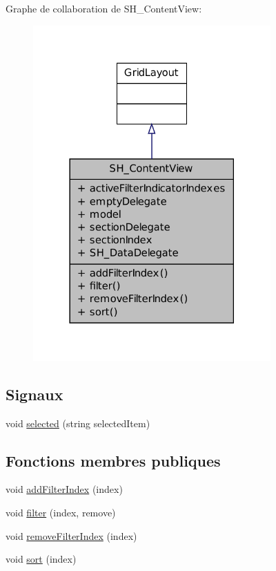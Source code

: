 Graphe de collaboration de S\-H\-\_\-\-Content\-View\-:
\nopagebreak
\begin{figure}[H]
\begin{center}
\leavevmode
\includegraphics[width=258pt]{classSH__ContentView__coll__graph}
\end{center}
\end{figure}
\subsection*{Signaux}
\begin{DoxyCompactItemize}
\item 
void \hyperlink{classSH__ContentView_a85c8e92ea6e076446a3b0415d758350f}{selected} (string selected\-Item)
\end{DoxyCompactItemize}
\subsection*{Fonctions membres publiques}
\begin{DoxyCompactItemize}
\item 
void \hyperlink{classSH__ContentView_ac6937d4b79d1b7fb205b69f6bd12c29f}{add\-Filter\-Index} (index)
\item 
void \hyperlink{classSH__ContentView_a281e67d2abc15c9e81895284717bce43}{filter} (index, remove)
\item 
void \hyperlink{classSH__ContentView_a9edbc3b09400eed69c0d6d5be1f40e39}{remove\-Filter\-Index} (index)
\item 
void \hyperlink{classSH__ContentView_a32bbe22a5ea495a3fdb935e1dcc97bba}{sort} (index)
\end{DoxyCompactItemize}
